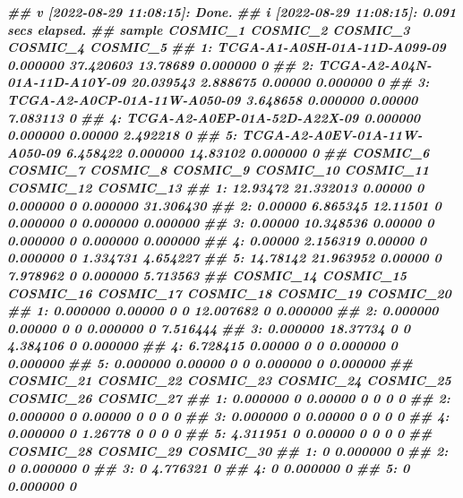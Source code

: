\documentclass[
  12pt,
  a4paper,
  twoside]{book}
\newenvironment{Shaded}{\begin{snugshade}}{\end{snugshade}}
\newcommand{\DocumentationTok}[1]{\textcolor[rgb]{0.56,0.35,0.01}{\textbf{\textit{#1}}}}
\begin{document}
\begin{Shaded}
\begin{Highlighting}[]
\DocumentationTok{\#\# v [2022{-}08{-}29 11:08:15]: Done.}
\DocumentationTok{\#\# i [2022{-}08{-}29 11:08:15]: 0.091 secs elapsed.}
\DocumentationTok{\#\#                          sample  COSMIC\_1  COSMIC\_2 COSMIC\_3 COSMIC\_4 COSMIC\_5}
\DocumentationTok{\#\# 1: TCGA{-}A1{-}A0SH{-}01A{-}11D{-}A099{-}09  0.000000 37.420603 13.78689 0.000000        0}
\DocumentationTok{\#\# 2: TCGA{-}A2{-}A04N{-}01A{-}11D{-}A10Y{-}09 20.039543  2.888675  0.00000 0.000000        0}
\DocumentationTok{\#\# 3: TCGA{-}A2{-}A0CP{-}01A{-}11W{-}A050{-}09  3.648658  0.000000  0.00000 7.083113        0}
\DocumentationTok{\#\# 4: TCGA{-}A2{-}A0EP{-}01A{-}52D{-}A22X{-}09  0.000000  0.000000  0.00000 2.492218        0}
\DocumentationTok{\#\# 5: TCGA{-}A2{-}A0EV{-}01A{-}11W{-}A050{-}09  6.458422  0.000000 14.83102 0.000000        0}
\DocumentationTok{\#\#    COSMIC\_6  COSMIC\_7 COSMIC\_8 COSMIC\_9 COSMIC\_10 COSMIC\_11 COSMIC\_12 COSMIC\_13}
\DocumentationTok{\#\# 1: 12.93472 21.332013  0.00000        0  0.000000         0  0.000000 31.306430}
\DocumentationTok{\#\# 2:  0.00000  6.865345 12.11501        0  0.000000         0  0.000000  0.000000}
\DocumentationTok{\#\# 3:  0.00000 10.348536  0.00000        0  0.000000         0  0.000000  0.000000}
\DocumentationTok{\#\# 4:  0.00000  2.156319  0.00000        0  0.000000         0  1.334731  4.654227}
\DocumentationTok{\#\# 5: 14.78142 21.963952  0.00000        0  7.978962         0  0.000000  5.713563}
\DocumentationTok{\#\#    COSMIC\_14 COSMIC\_15 COSMIC\_16 COSMIC\_17 COSMIC\_18 COSMIC\_19 COSMIC\_20}
\DocumentationTok{\#\# 1:  0.000000   0.00000         0         0 12.007682         0  0.000000}
\DocumentationTok{\#\# 2:  0.000000   0.00000         0         0  0.000000         0  7.516444}
\DocumentationTok{\#\# 3:  0.000000  18.37734         0         0  4.384106         0  0.000000}
\DocumentationTok{\#\# 4:  6.728415   0.00000         0         0  0.000000         0  0.000000}
\DocumentationTok{\#\# 5:  0.000000   0.00000         0         0  0.000000         0  0.000000}
\DocumentationTok{\#\#    COSMIC\_21 COSMIC\_22 COSMIC\_23 COSMIC\_24 COSMIC\_25 COSMIC\_26 COSMIC\_27}
\DocumentationTok{\#\# 1:  0.000000         0   0.00000         0         0         0         0}
\DocumentationTok{\#\# 2:  0.000000         0   0.00000         0         0         0         0}
\DocumentationTok{\#\# 3:  0.000000         0   0.00000         0         0         0         0}
\DocumentationTok{\#\# 4:  0.000000         0   1.26778         0         0         0         0}
\DocumentationTok{\#\# 5:  4.311951         0   0.00000         0         0         0         0}
\DocumentationTok{\#\#    COSMIC\_28 COSMIC\_29 COSMIC\_30}
\DocumentationTok{\#\# 1:         0  0.000000         0}
\DocumentationTok{\#\# 2:         0  0.000000         0}
\DocumentationTok{\#\# 3:         0  4.776321         0}
\DocumentationTok{\#\# 4:         0  0.000000         0}
\DocumentationTok{\#\# 5:         0  0.000000         0}
\end{Highlighting}
\end{Shaded}
\end{document}
